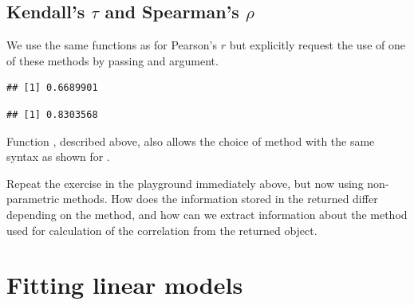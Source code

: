 \documentclass[krantz2]{krantz}\usepackage{knitr}
\begin{document}
\subsection{Kendall's $\tau$ and Spearman's $\rho$}

We use the same functions as for Pearson's $r$ but explicitly request the use of one of these methods by passing and argument.

\begin{knitrout}\footnotesize
{}\color{fgcolor}\begin{kframe}
\begin{alltt}
\hlstd{(} \hlopt{$}  \hlopt{$}  \hlstd{=} \hlstd{)}
\end{alltt}
\begin{verbatim}
## [1] 0.6689901
\end{verbatim}
\begin{alltt}
\hlstd{(} \hlopt{$}  \hlopt{$}  \hlstd{=} \hlstd{)}
\end{alltt}
\begin{verbatim}
## [1] 0.8303568
\end{verbatim}
\end{kframe}
\end{knitrout}

Function , described above, also allows the choice of method with the same syntax as shown for .

\begin{playground}
Repeat the exercise in the playground immediately above, but now using non-parametric methods. How does the information stored in the returned  differ depending on the method, and how can we extract information about the method used for calculation of the correlation from the returned object.
\end{playground}

\section{Fitting linear models}\label{sec:stat:LM}
\end{document}

